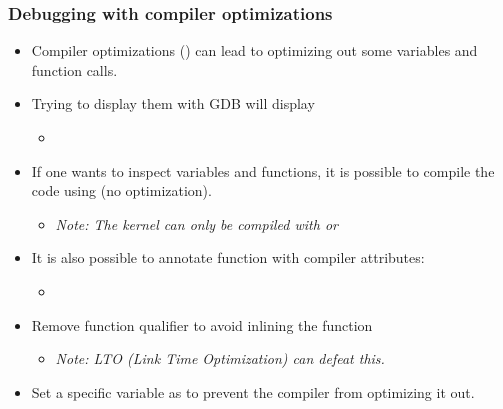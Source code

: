 \begin{frame}[fragile]
  \frametitle{Debugging with compiler optimizations}
  \begin{itemize}
    \item Compiler optimizations () can lead to optimizing out some variables
          and function calls.
    \item Trying to display them with GDB will display
    \begin{itemize}
      \item {}
    \end{itemize}
    \item If one wants to inspect variables and functions, it is possible to
          compile the code using  (no optimization).
    \begin{itemize}
      \item {\em Note: The kernel can only be compiled with  or }
    \end{itemize}
    \item It is also possible to annotate function with compiler attributes:
    \begin{itemize}
      \item {}
    \end{itemize}
    \item Remove function  qualifier to avoid inlining the function
    \begin{itemize}
      \item {\em Note: LTO (Link Time Optimization) can defeat this.}
    \end{itemize}
    \item Set a specific variable as  to prevent the compiler
          from optimizing it out.
  \end{itemize}
\end{frame}

